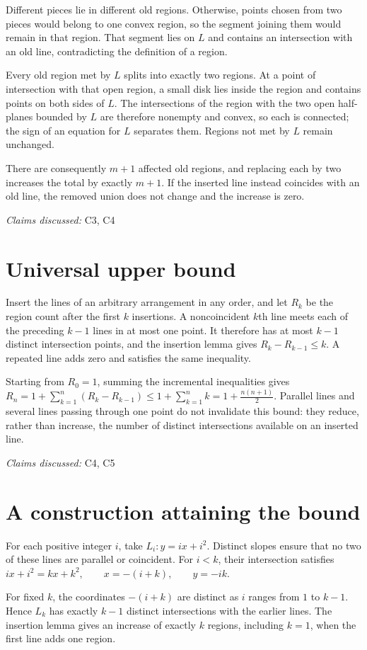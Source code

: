 \documentclass[11pt]{article}
\begin{document}
Different pieces lie in different old regions. Otherwise, points chosen from two pieces would belong to one convex region, so the segment joining them would remain in that region. That segment lies on $L$ and contains an intersection with an old line, contradicting the definition of a region.

Every old region met by $L$ splits into exactly two regions. At a point of intersection with that open region, a small disk lies inside the region and contains points on both sides of $L$. The intersections of the region with the two open half-planes bounded by $L$ are therefore nonempty and convex, so each is connected; the sign of an equation for $L$ separates them. Regions not met by $L$ remain unchanged.

There are consequently $m+1$ affected old regions, and replacing each by two increases the total by exactly $m+1$. If the inserted line instead coincides with an old line, the removed union does not change and the increase is zero.

\textit{Claims discussed: }C3, C4
\section{Universal upper bound}
Insert the lines of an arbitrary arrangement in any order, and let $R_k$ be the region count after the first $k$ insertions. A noncoincident $k$th line meets each of the preceding $k-1$ lines in at most one point. It therefore has at most $k-1$ distinct intersection points, and the insertion lemma gives $R_k-R_{k-1}\leq k$. A repeated line adds zero and satisfies the same inequality.

Starting from $R_0=1$, summing the incremental inequalities gives
$R_n=1+\sum_{k=1}^{n}(R_k-R_{k-1})\leq 1+\sum_{k=1}^{n}k=1+\frac{n(n+1)}{2}$. Parallel lines and several lines passing through one point do not invalidate this bound: they reduce, rather than increase, the number of distinct intersections available on an inserted line.

\textit{Claims discussed: }C4, C5
\section{A construction attaining the bound}
For each positive integer $i$, take $L_i: y=ix+i^2$. Distinct slopes ensure that no two of these lines are parallel or coincident. For $i<k$, their intersection satisfies
$ix+i^2=kx+k^2,\qquad x=-(i+k),\qquad y=-ik$.

For fixed $k$, the coordinates $-(i+k)$ are distinct as $i$ ranges from $1$ to $k-1$. Hence $L_k$ has exactly $k-1$ distinct intersections with the earlier lines. The insertion lemma gives an increase of exactly $k$ regions, including $k=1$, when the first line adds one region.
\end{document}
